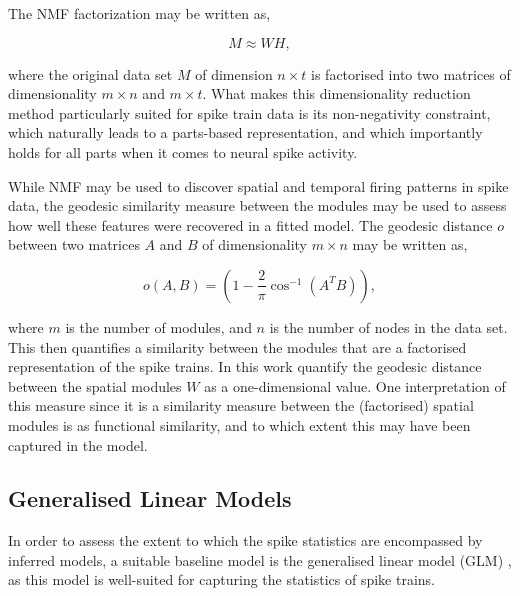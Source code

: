 \documentclass[mphil,deptreport,ianc]{infthesis} %
\begin{document}
The NMF factorization may be written as,

\begin{equation}
    M \approx WH,
\end{equation}

where the original data set $M$ of dimension $n \times t$ is factorised into two matrices of dimensionality $m \times n$ and $m \times t$.
What makes this dimensionality reduction method particularly suited for spike train data is its non-negativity constraint, which naturally leads to a parts-based representation, and which importantly holds for all parts when it comes to neural spike activity.

While NMF may be used to discover spatial and temporal firing patterns in spike data, the geodesic similarity measure between the modules may be used to assess how well these features were recovered in a fitted model.
The geodesic distance $o$ between two matrices $A$ and $B$ of dimensionality $m \times n$ may be written as,

\begin{equation}
    o(A, B) = (1-\frac{2}{\pi}\cos^{-1}(A^TB)),
\end{equation}

where $m$ is the number of modules, and $n$ is the number of nodes in the data set.
This then quantifies a similarity between the modules that are a factorised representation of the spike trains. 
In this work quantify the geodesic distance between the spatial modules $W$ as a one-dimensional value. One interpretation of this measure since it is a similarity measure between the (factorised) spatial modules is as functional similarity, and to which extent this may have been captured in the model.


\subsection{Generalised Linear Models}\label{subsect:GLMs}

In order to assess the extent to which the spike statistics are encompassed by inferred models, a suitable baseline model is the generalised linear model (GLM) \cite{Nelder1972, Fernandez2000}, as this model is well-suited for capturing the statistics of spike trains.
\end{document}
